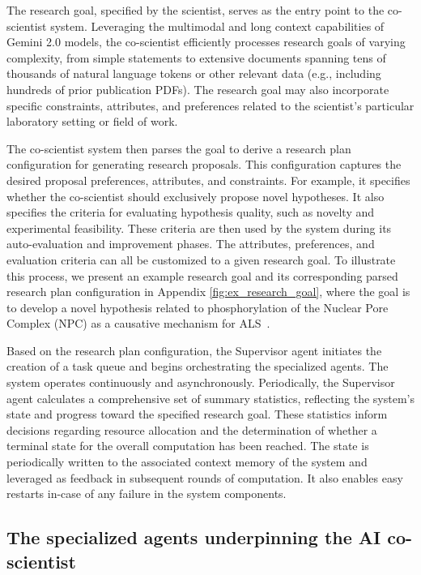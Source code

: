 The research goal, specified by the scientist, serves as the entry point to the co-scientist system. Leveraging the multimodal and long context capabilities of Gemini 2.0 models, the co-scientist efficiently processes research goals of varying complexity, from simple statements to extensive documents spanning tens of thousands of natural language tokens or other relevant data (e.g., including hundreds of prior publication PDFs). The research goal may also incorporate specific constraints, attributes, and preferences related to the scientist's particular laboratory setting or field of work.

The co-scientist system then parses the goal to derive a research plan configuration for generating research proposals. This configuration captures the desired proposal preferences, attributes, and constraints. For example, it specifies whether the co-scientist should exclusively propose novel hypotheses. It also specifies the criteria for evaluating hypothesis quality, such as novelty and experimental feasibility. These criteria are then used by the system during its auto-evaluation and improvement phases. The attributes, preferences, and evaluation criteria can all be customized to a given research goal. To illustrate this process, we present an example research goal and its corresponding parsed research plan configuration in Appendix \cref{fig:ex_research_goal}, where the goal is to develop a novel hypothesis related to phosphorylation of the Nuclear Pore Complex (NPC) as a causative mechanism for ALS~\citep{megat2023integrative}.

Based on the research plan configuration, the Supervisor agent initiates the creation of a task queue and begins orchestrating the specialized agents.  The system operates continuously and asynchronously.  Periodically, the Supervisor agent calculates a comprehensive set of summary statistics, reflecting the system's state and progress toward the specified research goal. These statistics inform decisions regarding resource allocation and the determination of whether a terminal state for the overall computation has been reached. The state is periodically written to the associated context memory of the system and leveraged as feedback in subsequent rounds of computation. It also enables easy restarts in-case of any failure in the system components.

\subsection{The specialized agents underpinning the AI co-scientist}


